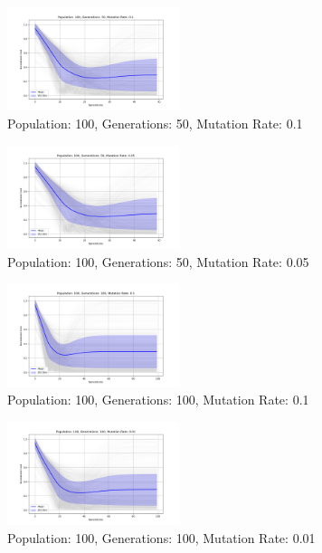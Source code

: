 \documentclass[
]{article}
\begin{document}
    \begin{figure}[H]
        \centering
        \includegraphics[width=0.45\textwidth]{genetic_algorithm/appendix/Population_100_Generations_50_MutationRate_0.1}
        \caption{Population: 100, Generations: 50, Mutation Rate: 0.1}
        \label{fig:app_ga_100_50_1}
    \end{figure}

    \begin{figure}[H]
        \centering
        \includegraphics[width=0.45\textwidth]{genetic_algorithm/appendix/Population_100_Generations_50_MutationRate_0.05}
        \caption{Population: 100, Generations: 50, Mutation Rate: 0.05}
        \label{fig:app_ga_100_50_05}
    \end{figure}

    \begin{figure}[H]
        \centering
        \includegraphics[width=0.45\textwidth]{genetic_algorithm/appendix/Population_100_Generations_100_MutationRate_0.1}
        \caption{Population: 100, Generations: 100, Mutation Rate: 0.1}
        \label{fig:app_ga_100_100_1}
    \end{figure}

    \begin{figure}[H]
        \centering
        \includegraphics[width=0.45\textwidth]{genetic_algorithm/appendix/Population_100_Generations_100_MutationRate_0.01}
        \caption{Population: 100, Generations: 100, Mutation Rate: 0.01}
        \label{fig:app_ga_100_100_01}
    \end{figure}
\end{document}
